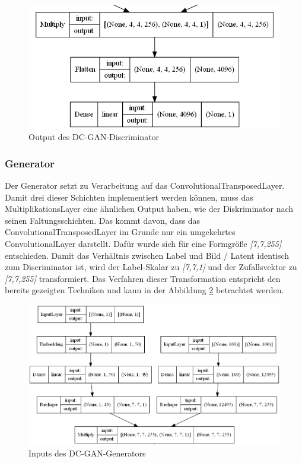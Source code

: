 \begin{figure}[H]
	\centering
	\includegraphics[height=0.2\textheight]{kapitel/5_ergebnisse/architectures/dcgan_disriminator/output.png}
	\caption{Output des DC-GAN-Discriminator}
	\label{architecture:dcgan-dis-output}
\end{figure}

\subsubsection{Generator}
Der Generator setzt zu Verarbeitung auf das ConvolutionalTransposedLayer.
Damit drei dieser Schichten implementiert werden können, muss das MultiplikationsLayer eine ähnlichen Output haben, wie der Diskriminator nach seinen Faltungsschichten.
Das kommt davon, dass das ConvolutionalTransposedLayer im Grunde nur ein umgekehrtes ConvolutionalLayer darstellt.
Dafür wurde sich für eine Formgröße \textit{[7,7,255]} entschieden.
Damit das Verhältnis zwischen Label und Bild / Latent identisch zum Discriminator ist, wird der Label-Skalar zu \textit{[7,7,1]} und der Zufallsvektor zu \textit{[7,7,255]} transformiert.
Das Verfahren dieser Transformation entspricht den bereits gezeigten Techniken und kann in der Abbildung \ref{architecture:dcgan-gen-intpu} betrachtet werden.

\begin{figure}[H]
	\centering
	\includegraphics[height=0.3\textheight]{kapitel/5_ergebnisse/architectures/dcgan_generator/input.png}
	\caption{Inputs des DC-GAN-Generators}
	\label{architecture:dcgan-gen-intpu}
\end{figure}

